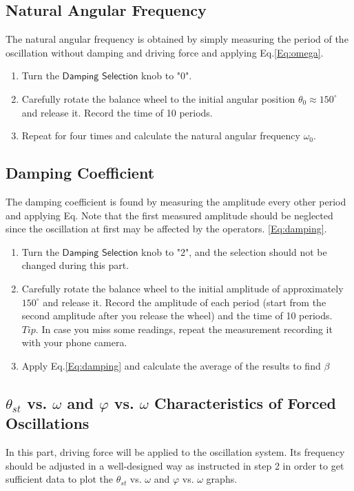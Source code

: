 \documentclass[a4paper]{article}
\begin{document}
\subsection{Natural Angular Frequency}\label{mepronatural}
The natural angular frequency is obtained by simply measuring the period of the oscillation without damping and driving force and applying Eq.\ref{Eq:omega}.
\begin{enumerate}
\item Turn the $\textsf{Damping Selection}$ knob to "0". 
\item Carefully rotate the balance wheel to the initial angular position $\theta_0 \approx 150^\circ$ and release it. Record the time of 10 periods.
\item Repeat for four times and calculate the natural angular frequency $\omega_0$.
\end{enumerate}

\subsection{Damping Coefficient}\label{meprodamping}
The damping coefficient is found by measuring the amplitude every other period and applying Eq.
Note that the first measured amplitude should be neglected since the oscillation at first may be affected by the operators.
\ref{Eq:damping}.
\begin{enumerate}
\item Turn the $\textsf{Damping Selection}$ knob to "2", and the selection should not be changed during this part.
\item Carefully rotate the balance wheel to the initial amplitude of approximately $150^\circ$ and release it. Record the amplitude of each period (start from the second amplitude after you release the wheel) and the time of 10 periods. \\
$\textit{Tip.}$ In case you miss some readings, repeat the measurement recording it with your phone camera.
\item Apply Eq.\ref{Eq:damping} and calculate the average of the results to find $\beta$
\end{enumerate}

\subsection{$\theta_{st}$ vs. $\omega$ and $\varphi$ vs. $\omega$ Characteristics of Forced Oscillations}\label{proc3}
In this part, driving force will be applied to the oscillation system. Its frequency should be adjusted in a well-designed way as instructed in step 2 in order to get sufficient data to plot the $\theta_{st}$ vs. $\omega$ and $\varphi$ vs. $\omega$ graphs.
\end{document}
